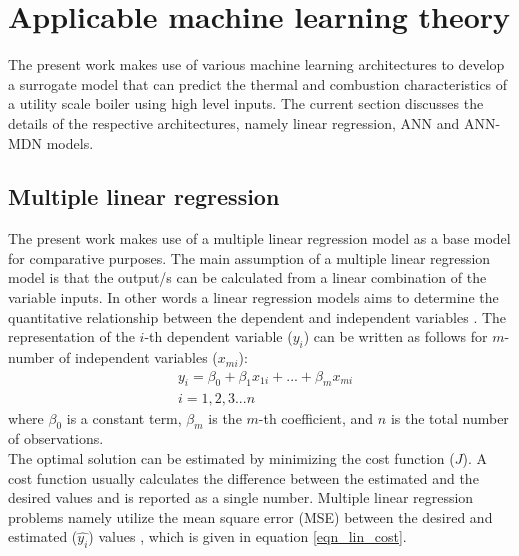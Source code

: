 \documentclass[a4paper,fleqn]{cas-sc}
\newtheorem{theorem}{Algorithm}
\newtheorem{lemma}[theorem]{Lemma}
\begin{document}



\section{Applicable machine learning theory}
The present work makes use of various machine learning architectures to develop a surrogate model that can predict the thermal and combustion characteristics of a utility scale boiler using high level inputs. The current section discusses the details of the respective architectures, namely linear regression, ANN and ANN-MDN models.  
\subsection{Multiple linear regression}
The present work makes use of a multiple linear regression model as a base model for comparative purposes. The main assumption of a multiple linear regression model is that the output/s can be calculated from a linear combination of the variable inputs. In other words a linear regression models aims to determine the quantitative relationship between the dependent and independent variables \cite{Wen2022}. The representation of the $i$-th dependent variable ($y_i$) can be written as follows for $m$-number of independent variables ($x_{mi}$):
\begin{equation}
\begin{split}
&y_i = \beta_0+\beta_1x_{1i}+...+\beta_mx_{mi}\\
&i = 1,2,3...n
\end{split}
\end{equation}
where $\beta_0$ is a constant term, $\beta_{m}$ is the $m$-th coefficient, and $n$ is the total number of observations.\\
 
The optimal solution can be estimated by minimizing the cost function ($J$). A cost function usually calculates the difference between the estimated and the desired values and is reported as a single number. Multiple linear regression problems namely utilize the mean square error (MSE) between the desired and estimated ($\hat{y_i}$)  values \cite{Wheeler2019}, which is given in equation \ref{eqn_lin_cost}.
 
\end{document}
